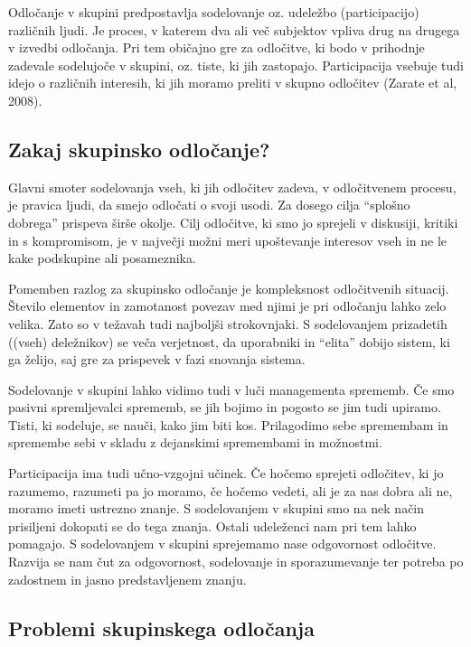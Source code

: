 Odločanje v skupini predpostavlja sodelovanje oz. udeležbo (participacijo) različnih ljudi. Je proces, v katerem dva ali več subjektov vpliva drug na drugega v izvedbi odločanja. Pri tem običajno gre za odločitve, ki bodo v prihodnje zadevale sodelujoče v skupini, oz. tiste, ki jih zastopajo. Participacija vsebuje tudi idejo o različnih interesih, ki jih moramo preliti v skupno odločitev (Zarate et al, 2008).


\subsection{Zakaj skupinsko odločanje?}

Glavni smoter sodelovanja vseh, ki jih odločitev zadeva, v odločitvenem procesu, je pravica ljudi, da smejo odločati o svoji usodi. Za dosego cilja ``splošno dobrega'' prispeva širše okolje. Cilj odločitve, ki smo jo sprejeli v diskusiji, kritiki in s kompromisom, je v največji možni meri upoštevanje interesov vseh in ne le kake podskupine ali posameznika.

Pomemben razlog za skupinsko odločanje je kompleksnost odločitvenih situacij. Število elementov in zamotanost povezav med njimi je pri odločanju lahko zelo velika. Zato so v težavah tudi najboljši strokovnjaki. S sodelovanjem prizadetih ((vseh) deležnikov) se veča verjetnost, da uporabniki in ``elita'' dobijo sistem, ki ga želijo, saj gre za prispevek v fazi snovanja sistema.

Sodelovanje v skupini lahko vidimo tudi v luči managementa sprememb. Če smo pasivni spremljevalci sprememb, se jih bojimo in pogosto se jim tudi upiramo. Tisti, ki sodeluje, se nauči, kako jim biti kos. Prilagodimo sebe spremembam in spremembe sebi v skladu z dejanskimi spremembami in možnostmi.

Participacija ima tudi učno-vzgojni učinek. Če hočemo sprejeti odločitev, ki jo razumemo, razumeti pa jo moramo, če hočemo vedeti, ali je za nas dobra ali ne, moramo imeti ustrezno znanje. S sodelovanjem v skupini smo na nek način prisiljeni dokopati se do tega znanja. Ostali udeleženci nam pri tem lahko pomagajo. S sodelovanjem v skupini sprejemamo nase odgovornost odločitve. Razvija se nam čut za odgovornost, sodelovanje in sporazumevanje ter potreba po zadostnem in jasno predstavljenem znanju.


\subsection{Problemi skupinskega odločanja}

